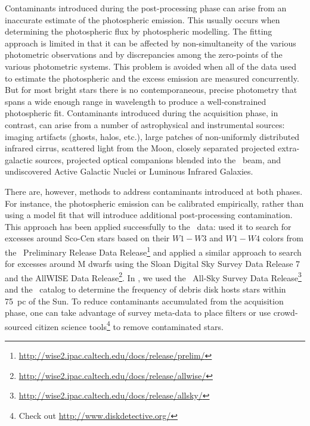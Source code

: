 	Contaminants introduced during the post-processing phase can arise from an inaccurate estimate of the photospheric emission. This usually occurs when determining the photospheric flux by photospheric modelling. The fitting approach is limited %
	in that it can be affected by non-simultaneity of the various photometric observations and by discrepancies among the zero-points of the various photometric systems. This problem is avoided when all of the data used to estimate the photospheric and the excess emission are measured concurrently. But for most bright stars there is no contemporaneous, precise photometry that spans a wide enough range in wavelength to produce a well-constrained photospheric fit.  Contaminants introduced during the acquisition phase, in contrast, can arise from a number of astrophysical and instrumental sources: imaging artifacts (ghosts, halos, etc.), large patches of non-uniformly distributed infrared cirrus, scattered light from the Moon, closely separated projected extra-galactic sources, projected optical companions blended into the \WS\ beam, and undiscovered Active Galactic Nuclei or Luminous Infrared Galaxies. 
	
	
	There are, however, methods to address contaminants introduced at both phases. For instance, the photospheric emission can be calibrated empirically, rather than using a model fit that will introduce additional post-processing contamination. This approach has been applied successfully to the \WS\ data: \citet{Rizzuto2012} used it to search for excesses around Sco-Cen stars based on their $W1-W3$ and $W1-W4$ colors from  the \WS\ Preliminary Release Data Release\footnote{\url{http://wise2.ipac.caltech.edu/docs/release/prelim/}} and \citet{Theissen2014} applied a similar approach to search for excesses around M dwarfs using the Sloan Digital Sky Survey Data Release 7 and the AllWISE Data Release\footnote{\url{http://wise2.ipac.caltech.edu/docs/release/allwise/}}. In \citet[][henceforth as ]{Patel2014}, we used the \WS\ All-Sky Survey Data Release\footnote{\url{http://wise2.ipac.caltech.edu/docs/release/allsky/}} and the \hip\ catalog \citep{Perryman1997} to determine the frequency of debris disk hosts stars within 75~pc of the Sun. To reduce contaminants accumulated from the acquisition phase, one can take advantage of survey meta-data to place filters or use crowd-sourced citizen science tools\footnote{Check out \url{http://www.diskdetective.org/}} to remove contaminated stars. %

